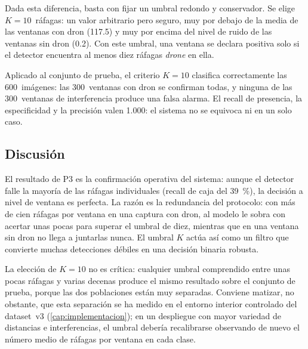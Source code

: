 Dada esta diferencia, basta con fijar un umbral redondo y conservador. Se elige $K=10$~ráfagas: un valor arbitrario pero seguro, muy por debajo de la media de las ventanas con dron (\num{117,5}) y muy por encima del nivel de ruido de las ventanas sin dron (\num{0,2}). Con este umbral, una ventana se declara positiva solo si el detector encuentra al menos diez ráfagas \emph{drone} en ella.

Aplicado al conjunto de prueba, el criterio $K=10$ clasifica correctamente las \num{600}~imágenes: las \num{300}~ventanas con dron se confirman todas, y ninguna de las \num{300}~ventanas de interferencia produce una falsa alarma. El recall de presencia, la especificidad y la precisión valen \num{1,000}: el sistema no se equivoca ni en un solo caso.

\subsection{Discusión}
\label{sec:p3_discusion}

El resultado de P3 es la confirmación operativa del sistema: aunque el detector falle la mayoría de las ráfagas individuales (recall de caja del \SI{39}{\percent}), la decisión a nivel de ventana es perfecta. La razón es la redundancia del protocolo: con más de cien ráfagas por ventana en una captura con dron, al modelo le sobra con acertar unas pocas para superar el umbral de diez, mientras que en una ventana sin dron no llega a juntarlas nunca. El umbral $K$ actúa así como un filtro que convierte muchas detecciones débiles en una decisión binaria robusta.

La elección de $K=10$ no es crítica: cualquier umbral comprendido entre unas pocas ráfagas y varias decenas produce el mismo resultado sobre el conjunto de prueba, porque las dos poblaciones están muy separadas. Conviene matizar, no obstante, que esta separación se ha medido en el entorno interior controlado del dataset~v3 (\cref{cap:implementacion}); en un despliegue con mayor variedad de distancias e interferencias, el umbral debería recalibrarse observando de nuevo el número medio de ráfagas por ventana en cada clase.
